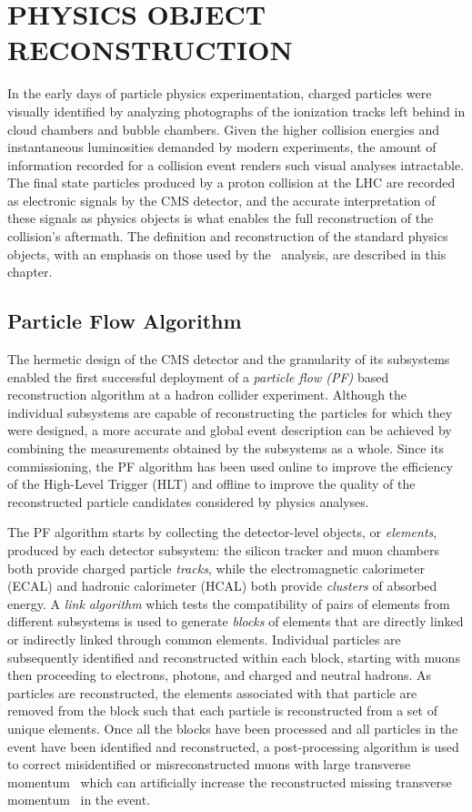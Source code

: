 \chapter{PHYSICS OBJECT RECONSTRUCTION} \label{reco}

In the early days of particle physics experimentation, charged particles were visually identified by analyzing photographs of the ionization tracks left behind in cloud chambers and bubble chambers. Given the higher collision energies and instantaneous luminosities demanded by modern experiments, the amount of information recorded for a collision event renders such visual analyses intractable. The final state particles produced by a proton collision at the LHC are recorded as electronic signals by the CMS detector, and the accurate interpretation of these signals as physics objects is what enables the full reconstruction of the collision's aftermath. The definition and reconstruction of the standard physics objects, with an emphasis on those used by the \VHbb\ analysis, are described in this chapter.

\section{Particle Flow Algorithm}

The hermetic design of the CMS detector and the granularity of its subsystems enabled the first successful deployment of a \textit{particle flow (PF)} based reconstruction algorithm at a hadron collider experiment.\cite{PARTICLEFLOW} Although the individual subsystems are capable of reconstructing the particles for which they were designed, a more accurate and global event description can be achieved by combining the measurements obtained by the subsystems as a whole. Since its commissioning, the PF algorithm has been used online to improve the efficiency of the High-Level Trigger (HLT) and offline to improve the quality of the reconstructed particle candidates considered by physics analyses.

The PF algorithm starts by collecting the detector-level objects, or \textit{elements}, produced by each detector subsystem: the silicon tracker and muon chambers both provide charged particle \textit{tracks}, while the electromagnetic calorimeter (ECAL) and hadronic calorimeter (HCAL) both provide \textit{clusters} of absorbed energy. A \textit{link algorithm} which tests the compatibility of pairs of elements from different subsystems is used to generate \textit{blocks} of elements that are directly linked or indirectly linked through common elements. Individual particles are subsequently identified and reconstructed within each block, starting with muons then proceeding to electrons, photons, and charged and neutral hadrons. As particles are reconstructed, the elements associated with that particle are removed from the block such that each particle is reconstructed from a set of unique elements. Once all the blocks have been processed and all particles in the event have been identified and reconstructed, a post-processing algorithm is used to correct misidentified or misreconstructed muons with large transverse momentum \pT\ which can artificially increase the reconstructed missing transverse momentum \pTmiss\ in the event.

